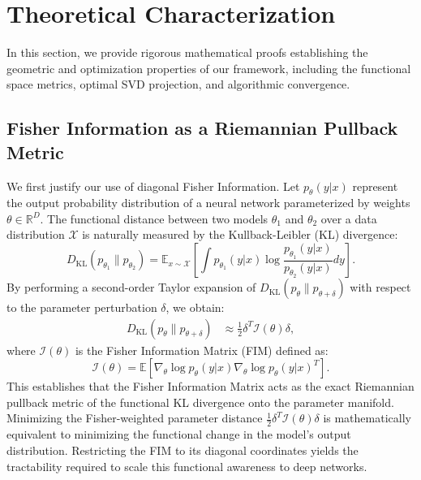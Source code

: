 \documentclass{article}
\theoremstyle{plain}
\theoremstyle{definition}
\theoremstyle{remark}
\begin{document}
\section{Theoretical Characterization}
\label{sec:theory}

In this section, we provide rigorous mathematical proofs establishing the geometric and optimization properties of our framework, including the functional space metrics, optimal SVD projection, and algorithmic convergence.

\subsection{Fisher Information as a Riemannian Pullback Metric}
We first justify our use of diagonal Fisher Information. Let $p_\theta(y | x)$ represent the output probability distribution of a neural network parameterized by weights $\theta \in \mathbb{R}^D$. The functional distance between two models $\theta_1$ and $\theta_2$ over a data distribution $\mathcal{X}$ is naturally measured by the Kullback-Leibler (KL) divergence:
\begin{equation}
D_{\text{KL}}(p_{\theta_1} \| p_{\theta_2}) = \mathbb{E}_{x \sim \mathcal{X}} \left[ \int p_{\theta_1}(y|x) \log \frac{p_{\theta_1}(y|x)}{p_{\theta_2}(y|x)} dy \right].
\end{equation}
By performing a second-order Taylor expansion of $D_{\text{KL}}(p_{\theta} \| p_{\theta + \delta})$ with respect to the parameter perturbation $\delta$, we obtain:
\begin{align}
D_{\text{KL}}(p_{\theta} \| p_{\theta + \delta}) &\approx \frac{1}{2} \delta^T \mathcal{I}(\theta) \delta,
\end{align}
where $\mathcal{I}(\theta)$ is the Fisher Information Matrix (FIM) defined as:
\begin{equation}
\mathcal{I}(\theta) = \mathbb{E} \left[ \nabla_\theta \log p_\theta(y|x) \nabla_\theta \log p_\theta(y|x)^T \right].
\end{equation}
This establishes that the Fisher Information Matrix acts as the exact Riemannian pullback metric of the functional KL divergence onto the parameter manifold. Minimizing the Fisher-weighted parameter distance $\frac{1}{2} \delta^T \mathcal{I}(\theta) \delta$ is mathematically equivalent to minimizing the functional change in the model's output distribution. Restricting the FIM to its diagonal coordinates yields the tractability required to scale this functional awareness to deep networks.
\end{document}
